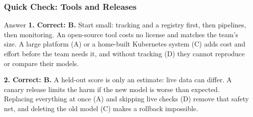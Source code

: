 \begin{frame}[fragile]\frametitle{Quick Check: Tools and Releases}
\begin{block}{Answer}
\textbf{1. Correct: B.} Start small: tracking and a registry first, then pipelines, then monitoring. An open-source tool costs no license and matches the team's size. A large platform (A) or a home-built Kubernetes system (C) adds cost and effort before the team needs it, and without tracking (D) they cannot reproduce or compare their models.

\textbf{2. Correct: B.} A held-out score is only an estimate: live data can differ. A canary release limits the harm if the new model is worse than expected. Replacing everything at once (A) and skipping live checks (D) remove that safety net, and deleting the old model (C) makes a rollback impossible.
\end{block}
\end{frame}


